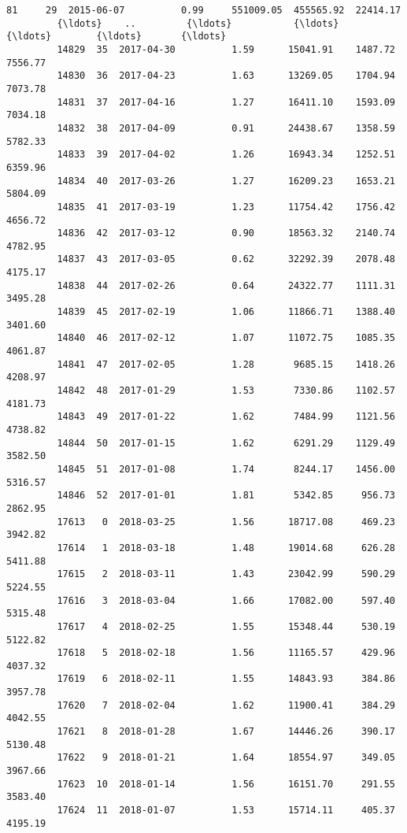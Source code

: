 \documentclass[11pt]{article}
\begin{document}
\begin{Verbatim}[commandchars=\\\{\}]
         81     29  2015-06-07          0.99     551009.05  455565.92  22414.17   
         {\ldots}    ..         {\ldots}           {\ldots}           {\ldots}        {\ldots}       {\ldots}   
         14829  35  2017-04-30          1.59      15041.91    1487.72   7556.77   
         14830  36  2017-04-23          1.63      13269.05    1704.94   7073.78   
         14831  37  2017-04-16          1.27      16411.10    1593.09   7034.18   
         14832  38  2017-04-09          0.91      24438.67    1358.59   5782.33   
         14833  39  2017-04-02          1.26      16943.34    1252.51   6359.96   
         14834  40  2017-03-26          1.27      16209.23    1653.21   5804.09   
         14835  41  2017-03-19          1.23      11754.42    1756.42   4656.72   
         14836  42  2017-03-12          0.90      18563.32    2140.74   4782.95   
         14837  43  2017-03-05          0.62      32292.39    2078.48   4175.17   
         14838  44  2017-02-26          0.64      24322.77    1111.31   3495.28   
         14839  45  2017-02-19          1.06      11866.71    1388.40   3401.60   
         14840  46  2017-02-12          1.07      11072.75    1085.35   4061.87   
         14841  47  2017-02-05          1.28       9685.15    1418.26   4208.97   
         14842  48  2017-01-29          1.53       7330.86    1102.57   4181.73   
         14843  49  2017-01-22          1.62       7484.99    1121.56   4738.82   
         14844  50  2017-01-15          1.62       6291.29    1129.49   3582.50   
         14845  51  2017-01-08          1.74       8244.17    1456.00   5316.57   
         14846  52  2017-01-01          1.81       5342.85     956.73   2862.95   
         17613   0  2018-03-25          1.56      18717.08     469.23   3942.82   
         17614   1  2018-03-18          1.48      19014.68     626.28   5411.88   
         17615   2  2018-03-11          1.43      23042.99     590.29   5224.55   
         17616   3  2018-03-04          1.66      17082.00     597.40   5315.48   
         17617   4  2018-02-25          1.55      15348.44     530.19   5122.82   
         17618   5  2018-02-18          1.56      11165.57     429.96   4037.32   
         17619   6  2018-02-11          1.55      14843.93     384.86   3957.78   
         17620   7  2018-02-04          1.62      11900.41     384.29   4042.55   
         17621   8  2018-01-28          1.67      14446.26     390.17   5130.48   
         17622   9  2018-01-21          1.64      18554.97     349.05   3967.66   
         17623  10  2018-01-14          1.56      16151.70     291.55   3583.40   
         17624  11  2018-01-07          1.53      15714.11     405.37   4195.19   
         

\end{Verbatim}
\end{document}
